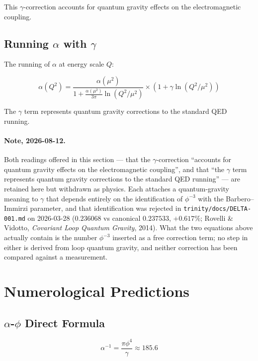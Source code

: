 \documentclass[12pt,a4paper]{article}
\begin{document}
This $\gamma$-correction accounts for quantum gravity effects on the electromagnetic coupling.

\subsection{Running $\alpha$ with $\gamma$}

The running of $\alpha$ at energy scale $Q$:

\begin{equation}
\alpha(Q^2) = \frac{\alpha(\mu^2)}{1 + \frac{\alpha(\mu^2)}{3\pi}\ln(Q^2/\mu^2)} \times (1 + \gamma \ln(Q^2/\mu^2))
\end{equation}

The $\gamma$ term represents quantum gravity corrections to the standard QED running.

\paragraph{Note, 2026-08-12.} Both readings offered in this section --- that the $\gamma$-correction ``accounts for quantum gravity effects on the electromagnetic coupling'', and that ``the $\gamma$ term represents quantum gravity corrections to the standard QED running'' --- are retained here but withdrawn as physics. Each attaches a quantum-gravity meaning to $\gamma$ that depends entirely on the identification of $\phi^{-3}$ with the Barbero--Immirzi parameter, and that identification was rejected in \texttt{trinity/docs/DELTA-001.md} on 2026-03-28 ($0.236068$ vs canonical $0.237533$, $+0.617\%$; Rovelli \& Vidotto, \emph{Covariant Loop Quantum Gravity}, 2014). What the two equations above actually contain is the number $\phi^{-3}$ inserted as a free correction term; no step in either is derived from loop quantum gravity, and neither correction has been compared against a measurement.

\section{Numerological Predictions}

\subsection{$\alpha$-$\phi$ Direct Formula}

\begin{equation}
\alpha^{-1} = \frac{\pi \phi^4}{\gamma} \approx 185.6
\end{equation}
\end{document}
